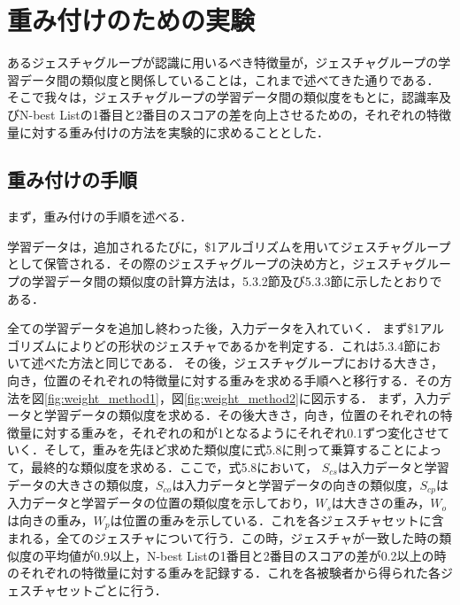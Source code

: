 
\section{重み付けのための実験}
あるジェスチャグループが認識に用いるべき特徴量が，ジェスチャグループの学習データ間の類似度と関係していることは，これまで述べてきた通りである．
そこで我々は，ジェスチャグループの学習データ間の類似度をもとに，認識率及びN-best Listの1番目と2番目のスコアの差を向上させるための，それぞれの特徴量に対する重み付けの方法を実験的に求めることとした．

\subsection{重み付けの手順}
まず，重み付けの手順を述べる．

学習データは，追加されるたびに，\$1アルゴリズムを用いてジェスチャグループとして保管される．その際のジェスチャグループの決め方と，ジェスチャグループの学習データ間の類似度の計算方法は，5.3.2節及び5.3.3節に示したとおりである．

全ての学習データを追加し終わった後，入力データを入れていく．
まず\$1アルゴリズムによりどの形状のジェスチャであるかを判定する．これは5.3.4節において述べた方法と同じである．
その後，ジェスチャグループにおける大きさ，向き，位置のそれぞれの特徴量に対する重みを求める手順へと移行する．その方法を図\ref{fig:weight_method1}，図\ref{fig:weight_method2}に図示する．
まず，入力データと学習データの類似度を求める．その後大きさ，向き，位置のそれぞれの特徴量に対する重みを，それぞれの和が1となるようにそれぞれ0.1ずつ変化させていく．そして，重みを先ほど求めた類似度に式5.8に則って乗算することによって，最終的な類似度を求める．ここで，式5.8において， $S_\textit{cs}$は入力データと学習データの大きさの類似度，$S_\textit{co}$は入力データと学習データの向きの類似度，$S_\textit{cp}$は入力データと学習データの位置の類似度を示しており，$W_\textit{s}$は大きさの重み，$W_\textit{o}$は向きの重み，$W_\textit{p}$は位置の重みを示している．これを各ジェスチャセットに含まれる，全てのジェスチャについて行う．この時，ジェスチャが一致した時の類似度の平均値が0.9以上，N-best Listの1番目と2番目のスコアの差が0.2以上の時のそれぞれの特徴量に対する重みを記録する．これを各被験者から得られた各ジェスチャセットごとに行う．

